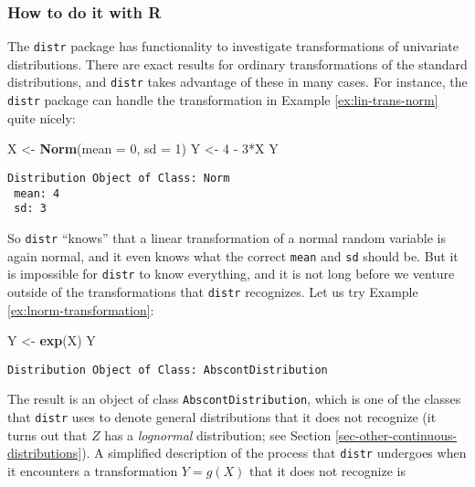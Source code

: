 \documentclass[]{book}
\newenvironment{Shaded}{\begin{snugshade}}{\end{snugshade}}
\newcommand{\KeywordTok}[1]{\textcolor[rgb]{0.13,0.29,0.53}{\textbf{{#1}}}}
\newcommand{\DataTypeTok}[1]{\textcolor[rgb]{0.13,0.29,0.53}{{#1}}}
\newcommand{\DecValTok}[1]{\textcolor[rgb]{0.00,0.00,0.81}{{#1}}}
\newcommand{\StringTok}[1]{\textcolor[rgb]{0.31,0.60,0.02}{{#1}}}
\newcommand{\NormalTok}[1]{{#1}}
\numberwithin{equation}{chapter}
\numberwithin{figure}{chapter}
\theoremstyle{plain}
\theoremstyle{definition}
\theoremstyle{remark}
\theoremstyle{definition}
\theoremstyle{definition}
\theoremstyle{remark}
\begin{document}
\subsubsection{How to do it with R}\label{how-to-do-it-with-r-26}

The \texttt{distr} package \autocite{distr} has functionality to
investigate transformations of univariate distributions. There are exact
results for ordinary transformations of the standard distributions, and
\texttt{distr} takes advantage of these in many cases. For instance, the
\texttt{distr} package can handle the transformation in Example
\ref{ex:lin-trans-norm} quite nicely:

\begin{Shaded}
\begin{Highlighting}[]
\NormalTok{X <-}\StringTok{ }\KeywordTok{Norm}\NormalTok{(}\DataTypeTok{mean =} \DecValTok{0}\NormalTok{, }\DataTypeTok{sd =} \DecValTok{1}\NormalTok{)}
\NormalTok{Y <-}\StringTok{ }\DecValTok{4} \NormalTok{-}\StringTok{ }\DecValTok{3}\NormalTok{*X}
\NormalTok{Y}
\end{Highlighting}
\end{Shaded}

\begin{verbatim}
Distribution Object of Class: Norm
 mean: 4
 sd: 3
\end{verbatim}

So \texttt{distr} ``knows'' that a linear transformation of a normal
random variable is again normal, and it even knows what the correct
\texttt{mean} and \texttt{sd} should be. But it is impossible for
\texttt{distr} to know everything, and it is not long before we venture
outside of the transformations that \texttt{distr} recognizes. Let us
try Example \ref{ex:lnorm-transformation}:

\begin{Shaded}
\begin{Highlighting}[]
\NormalTok{Y <-}\StringTok{ }\KeywordTok{exp}\NormalTok{(X)}
\NormalTok{Y}
\end{Highlighting}
\end{Shaded}

\begin{verbatim}
Distribution Object of Class: AbscontDistribution
\end{verbatim}

The result is an object of class \texttt{AbscontDistribution}, which is
one of the classes that \texttt{distr} uses to denote general
distributions that it does not recognize (it turns out that \(Z\) has a
\emph{lognormal} distribution; see Section
\ref{sec-other-continuous-distributions}). A simplified description of
the process that \texttt{distr} undergoes when it encounters a
transformation \(Y=g(X)\) that it does not recognize is
\end{document}
